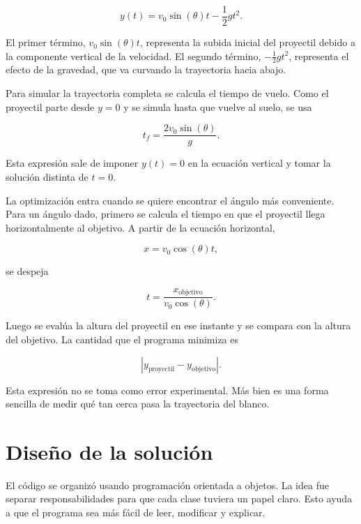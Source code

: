 \documentclass[12pt,letterpaper]{article}
\begin{document}
\begin{equation}
y(t)=v_0\sin(\theta)t-\frac{1}{2}gt^2.
\end{equation}

El primer t\'{e}rmino, \(v_0\sin(\theta)t\), representa la subida inicial del proyectil debido a la componente vertical de la velocidad. El segundo t\'{e}rmino, \(-\frac{1}{2}gt^2\), representa el efecto de la gravedad, que va curvando la trayectoria hacia abajo.

Para simular la trayectoria completa se calcula el tiempo de vuelo. Como el proyectil parte desde \(y=0\) y se simula hasta que vuelve al suelo, se usa

\begin{equation}
t_f=\frac{2v_0\sin(\theta)}{g}.
\end{equation}

Esta expresi\'{o}n sale de imponer \(y(t)=0\) en la ecuaci\'{o}n vertical y tomar la soluci\'{o}n distinta de \(t=0\).

La optimizaci\'{o}n entra cuando se quiere encontrar el \'{a}ngulo m\'{a}s conveniente. Para un \'{a}ngulo dado, primero se calcula el tiempo en que el proyectil llega horizontalmente al objetivo. A partir de la ecuaci\'{o}n horizontal,

\begin{equation}
x=v_0\cos(\theta)t,
\end{equation}

se despeja

\begin{equation}
t=\frac{x_{\text{objetivo}}}{v_0\cos(\theta)}.
\end{equation}

Luego se eval\'{u}a la altura del proyectil en ese instante y se compara con la altura del objetivo. La cantidad que el programa minimiza es

\begin{equation}
\left|y_{\text{proyectil}}-y_{\text{objetivo}}\right|.
\end{equation}

Esta expresi\'{o}n no se toma como error experimental. M\'{a}s bien es una forma sencilla de medir qu\'{e} tan cerca pasa la trayectoria del blanco.

\section{Dise\~{n}o de la soluci\'{o}n}

El c\'{o}digo se organiz\'{o} usando programaci\'{o}n orientada a objetos. La idea fue separar responsabilidades para que cada clase tuviera un papel claro. Esto ayuda a que el programa sea m\'{a}s f\'{a}cil de leer, modificar y explicar.
\end{document}

